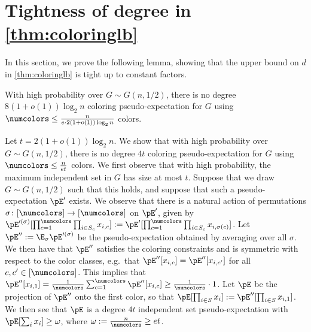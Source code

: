 \section{Tightness of degree in \cref{thm:coloringlb}}
\label{sec:independentsetrefutation}
In this section, we prove the following lemma, showing that the upper bound on $d$ in \cref{thm:coloringlb} is tight up to constant factors.
\begin{lemma}
With high probability over $G \sim G(n,1/2)$, there is no degree $8(1 + o(1)) \log_2 n$ coloring pseudo-expectation for $G$ using $\numcolors \leq \frac{n}{e \cdot 2(1 + o(1))\log_2 n}$ colors.
\end{lemma}
Let $t = 2(1 + o(1)) \log_2 n$. We show that with high probability over $G \sim G(n,1/2)$, there is no degree $4t$ coloring pseudo-expectation for $G$ using $\numcolors \leq \frac{n}{e t}$ colors. We first observe that with high probability, the maximum independent set in $G$ has size at most $t$. Suppose that we draw $G \sim G(n,1/2)$ such that this holds, and suppose that such a pseudo-expectation $\pE'$ exists. We observe that there is a natural action of permutations $\sigma \colon [\numcolors] \to [\numcolors]$ on $\pE'$, given by $\pE'^{(\sigma)}[\prod_{c = 1}^\numcolors \prod_{i \in S_c} x_{i,c}] := \pE'[\prod_{c = 1}^\numcolors \prod_{i \in S_c} x_{i, \sigma(c)}]$. Let $\pE'' := \E_{\sigma} \pE'^{(\sigma)}$ be the pseudo-expectation obtained by averaging over all $\sigma$. We then have that $\pE''$ satisfies the coloring constraints and is symmetric with respect to the color classes, e.g.\ that $\pE''[x_{i,c}] = \pE''[x_{i,c'}]$ for all $c,c' \in [\numcolors]$. This implies that $\pE''[x_{i,1}] = \frac{1}{\numcolors} \sum_{c = 1}^\numcolors \pE''[x_{i,c}] \geq \frac{1}{\numcolors} \cdot 1$. Let $\pE$ be the projection of $\pE''$ onto the first color, so that $\pE[\prod_{i \in S} x_i] := \pE''[\prod_{i \in S} x_{i,1}]$. We then see that $\pE$ is a degree $4t$ independent set pseudo-expectation with $\pE[\sum_i x_i] \geq \omega$, where $\omega := \frac{n}{\numcolors} \geq e t$.

